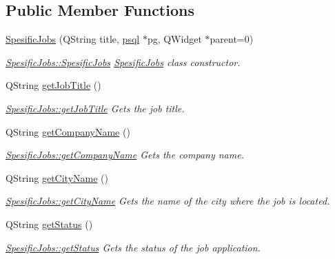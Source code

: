 \subsection*{Public Member Functions}
\begin{DoxyCompactItemize}
\item 
\hyperlink{class_spesific_jobs_a382c130bb70f2bf25c76ef5c720659d6}{Spesific\+Jobs} (Q\+String title, \hyperlink{classpsql}{psql} $\ast$pg, Q\+Widget $\ast$parent=0)
\begin{DoxyCompactList}\small\item\em \hyperlink{class_spesific_jobs_a382c130bb70f2bf25c76ef5c720659d6}{Spesific\+Jobs\+::\+Spesific\+Jobs} \hyperlink{class_spesific_jobs}{Spesific\+Jobs} class constructor. \end{DoxyCompactList}\item 
Q\+String \hyperlink{class_spesific_jobs_afe77ad902d3e9f3cfd5f057e0a37a193}{get\+Job\+Title} ()
\begin{DoxyCompactList}\small\item\em \hyperlink{class_spesific_jobs_afe77ad902d3e9f3cfd5f057e0a37a193}{Spesific\+Jobs\+::get\+Job\+Title} Gets the job title. \end{DoxyCompactList}\item 
Q\+String \hyperlink{class_spesific_jobs_a51afafde9872e78e8b09e3bc00a2a161}{get\+Company\+Name} ()
\begin{DoxyCompactList}\small\item\em \hyperlink{class_spesific_jobs_a51afafde9872e78e8b09e3bc00a2a161}{Spesific\+Jobs\+::get\+Company\+Name} Gets the company name. \end{DoxyCompactList}\item 
Q\+String \hyperlink{class_spesific_jobs_a39390d9c54635a2dc60c80322a7b42ed}{get\+City\+Name} ()
\begin{DoxyCompactList}\small\item\em \hyperlink{class_spesific_jobs_a39390d9c54635a2dc60c80322a7b42ed}{Spesific\+Jobs\+::get\+City\+Name} Gets the name of the city where the job is located. \end{DoxyCompactList}\item 
Q\+String \hyperlink{class_spesific_jobs_aefe905d920961199fec0aff37a34b50d}{get\+Status} ()
\begin{DoxyCompactList}\small\item\em \hyperlink{class_spesific_jobs_aefe905d920961199fec0aff37a34b50d}{Spesific\+Jobs\+::get\+Status} Gets the status of the job application. \end{DoxyCompactList}\item 

\end{DoxyCompactItemize}
